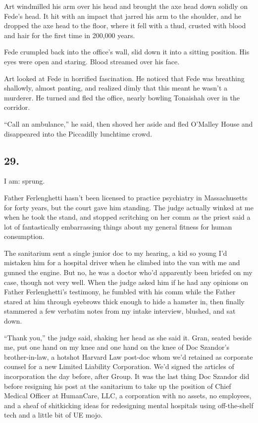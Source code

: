 Art windmilled his arm over his head and brought the axe head down
solidly on Fede’s head. It hit with an impact that jarred his arm
to the shoulder, and he dropped the axe head to the floor, where it
fell with a thud, crusted with blood and hair for the first time in
200,000 years.

Fede crumpled back into the office’s wall, slid down it into a
sitting position. His eyes were open and staring. Blood streamed
over his face.

Art looked at Fede in horrified fascination. He noticed that Fede
was breathing shallowly, almost panting, and realized dimly that
this meant he wasn’t a murderer. He turned and fled the office,
nearly bowling Tonaishah over in the corridor.

“Call an ambulance,” he said, then shoved her aside and fled
O’Malley House and disappeared into the Piccadilly lunchtime
crowd.

\subsection{29.}

I am: sprung.

Father Ferlenghetti hasn’t been licensed to practice psychiatry in
Massachusetts for forty years, but the court gave him standing. The
judge actually winked at me when he took the stand, and stopped
scritching on her comm as the priest said a lot of fantastically
embarrassing things about my general fitness for human
consumption.

The sanitarium sent a single junior doc to my hearing, a kid so
young I’d mistaken him for a hospital driver when he climbed into
the van with me and gunned the engine. But no, he was a doctor
who’d apparently been briefed on my case, though not very well.
When the judge asked him if he had any opinions on Father
Ferlenghetti’s testimony, he fumbled with his comm while the Father
stared at him through eyebrows thick enough to hide a hamster in,
then finally stammered a few verbatim notes from my intake
interview, blushed, and sat down.

“Thank you,” the judge said, shaking her head as she said it. Gran,
seated beside me, put one hand on my knee and one hand on the knee
of Doc Szandor’s brother-in-law, a hotshot Harvard Law post-doc
whom we’d retained as corporate counsel for a new Limited Liability
Corporation. We’d signed the articles of incorporation the day
before, after Group. It was the last thing Doc Szandor did before
resigning his post at the sanitarium to take up the position of
Chief Medical Officer at HumanCare, LLC, a corporation with no
assets, no employees, and a sheaf of shitkicking ideas for
redesigning mental hospitals using off-the-shelf tech and a little
bit of UE mojo.

